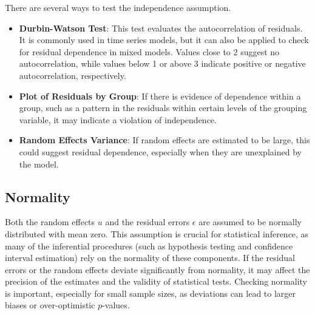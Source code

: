 There are several ways to test the independence assumption.
\begin{itemize}
\item \textbf{Durbin-Watson Test}: This test evaluates the autocorrelation of residuals. It is commonly used in time series models, but it can also be applied to check for residual dependence in mixed models. Values close to 2 suggest no autocorrelation, while values below 1 or above 3 indicate positive or negative autocorrelation, respectively.

\item \textbf{Plot of Residuals by Group}: If there is evidence of dependence within a group, such as a pattern in the residuals within certain levels of the grouping variable, it may indicate a violation of independence.

\item \textbf{Random Effects Variance}: If random effects are estimated to be large, this could suggest residual dependence, especially when they are unexplained by the model.
\end{itemize}

\subsection*{Normality}
Both the random effects $u$ and the residual errors $\epsilon$ are assumed to be normally distributed with mean zero. This assumption is crucial for statistical inference, as many of the inferential procedures (such as hypothesis testing and confidence interval estimation) rely on the normality of these components. If the residual errors or the random effects deviate significantly from normality, it may affect the precision of the estimates and the validity of statistical tests. Checking normality is important, especially for small sample sizes, as deviations can lead to larger biases or over-optimistic $p$-values.

